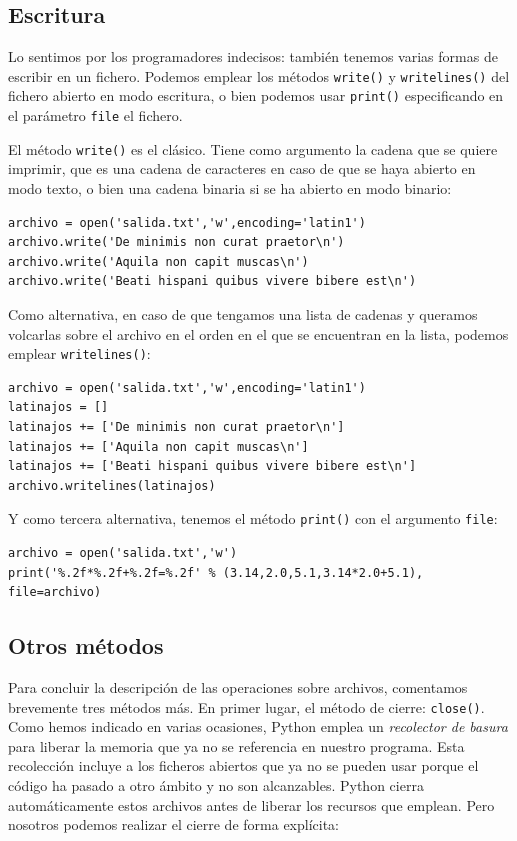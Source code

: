 \subsection{Escritura}

Lo sentimos por los programadores indecisos: también tenemos varias formas de escribir en un fichero. Podemos emplear los métodos \texttt{write()} y \texttt{writelines()} del fichero abierto en modo escritura, o bien podemos usar \texttt{print()} especificando en el parámetro \texttt{file} el fichero.

El método \texttt{write()} es el clásico. Tiene como argumento la cadena que se quiere imprimir, que es una cadena de caracteres en caso de que se haya abierto en modo texto, o bien una cadena binaria si se ha abierto en modo binario:

\begin{lstlisting}
archivo = open('salida.txt','w',encoding='latin1')
archivo.write('De minimis non curat praetor\n')
archivo.write('Aquila non capit muscas\n')
archivo.write('Beati hispani quibus vivere bibere est\n')
\end{lstlisting}

Como alternativa, en caso de que tengamos una lista de cadenas y queramos volcarlas sobre el archivo en el orden en el que se encuentran en la lista, podemos emplear \texttt{writelines()}:

\begin{lstlisting}
archivo = open('salida.txt','w',encoding='latin1')
latinajos = []
latinajos += ['De minimis non curat praetor\n']
latinajos += ['Aquila non capit muscas\n']
latinajos += ['Beati hispani quibus vivere bibere est\n']
archivo.writelines(latinajos)
\end{lstlisting}

Y como tercera alternativa, tenemos el método \texttt{print()} con el argumento \texttt{file}:

\begin{lstlisting}
archivo = open('salida.txt','w')
print('%.2f*%.2f+%.2f=%.2f' % (3.14,2.0,5.1,3.14*2.0+5.1), file=archivo)
\end{lstlisting}

\subsection{Otros métodos}

Para concluir la descripción de las operaciones sobre archivos, comentamos brevemente tres métodos más. En primer lugar, el método de cierre: \texttt{close()}. Como hemos indicado en varias ocasiones, Python emplea un \emph{recolector de basura} para liberar la memoria que ya no se referencia en nuestro programa. Esta recolección incluye a los ficheros abiertos que ya no se pueden usar porque el código ha pasado a otro ámbito y no son alcanzables. Python cierra automáticamente estos archivos antes de liberar los recursos que emplean. Pero nosotros podemos realizar el cierre de forma explícita:

